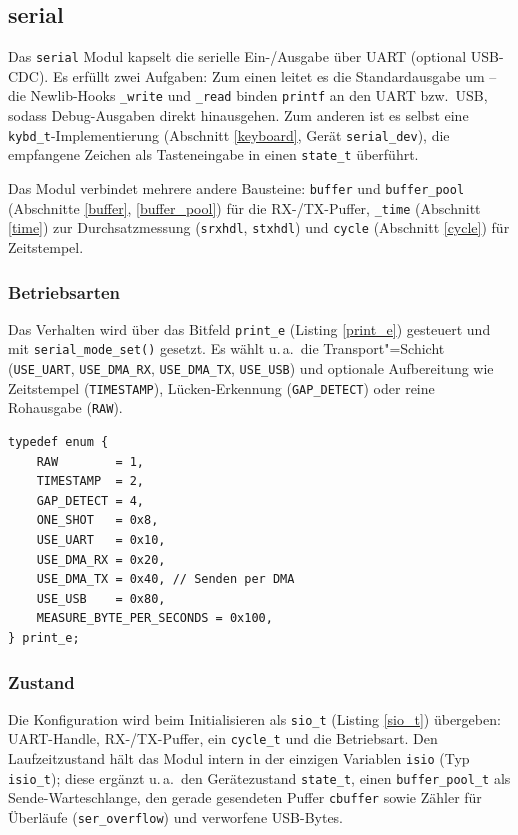 \subsection{serial}\label{serial}
Das \verb|serial| Modul kapselt die serielle Ein-/Ausgabe über UART
(optional USB-CDC). Es erfüllt zwei Aufgaben: Zum einen leitet es die
Standardausgabe um -- die Newlib-Hooks \verb|_write| und \verb|_read| binden
\verb|printf| an den UART bzw.\ USB, sodass Debug-Ausgaben direkt
hinausgehen. Zum anderen ist es selbst eine \verb|kybd_t|-Implementierung
(Abschnitt \ref{keyboard}, Gerät \verb|serial_dev|), die empfangene Zeichen
als Tasteneingabe in einen \verb|state_t| überführt.

Das Modul verbindet mehrere andere Bausteine: \verb|buffer| und
\verb|buffer_pool| (Abschnitte \ref{buffer}, \ref{buffer_pool}) für die
RX-/TX-Puffer, \verb|_time| (Abschnitt \ref{time}) zur Durchsatzmessung
(\verb|srxhdl|, \verb|stxhdl|) und \verb|cycle| (Abschnitt \ref{cycle}) für
Zeitstempel.

\subsubsection*{Betriebsarten}
{\sloppy
Das Verhalten wird über das Bitfeld \verb|print_e| (Listing \ref{print_e})
gesteuert und mit \verb|serial_mode_set()| gesetzt. Es wählt u.\,a.\ die
Transport"=Schicht (\verb|USE_UART|, \verb|USE_DMA_RX|, \verb|USE_DMA_TX|,
\verb|USE_USB|) und
optionale Aufbereitung wie Zeitstempel (\verb|TIMESTAMP|), Lücken-Erkennung
(\verb|GAP_DETECT|) oder reine Rohausgabe (\verb|RAW|).\par}

\begin{listing}
\begin{verbatim}
typedef enum {
    RAW        = 1,
    TIMESTAMP  = 2,
    GAP_DETECT = 4,
    ONE_SHOT   = 0x8,
    USE_UART   = 0x10,
    USE_DMA_RX = 0x20,
    USE_DMA_TX = 0x40, // Senden per DMA
    USE_USB    = 0x80,
    MEASURE_BYTE_PER_SECONDS = 0x100,
} print_e;
\end{verbatim}
\caption{Ausgabe-Betriebsarten \texttt{print\_e}}
\label{print_e}
\end{listing}

\subsubsection*{Zustand}
Die Konfiguration wird beim Initialisieren als \verb|sio_t| (Listing
\ref{sio_t}) übergeben: UART-Handle, RX-/TX-Puffer, ein \verb|cycle_t| und
die Betriebsart. Den Laufzeitzustand hält das Modul intern in der einzigen
Variablen \verb|isio| (Typ \verb|isio_t|); diese ergänzt u.\,a.\ den
Gerätezustand \verb|state_t|, einen \verb|buffer_pool_t| als
Sende-Warteschlange, den gerade gesendeten Puffer \verb|cbuffer| sowie Zähler
für Überläufe (\verb|ser_overflow|) und verworfene USB-Bytes.

